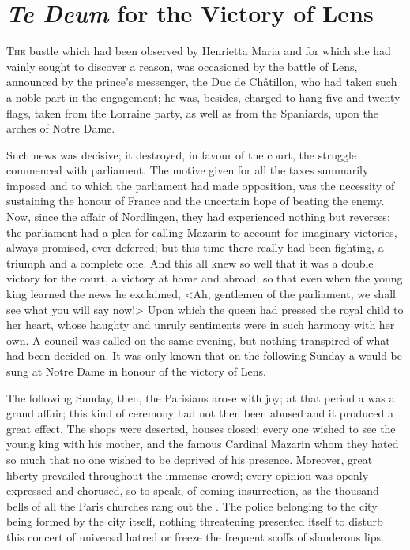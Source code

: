 \chapter{\emph{Te Deum} for the Victory of Lens}

 \lettrine{T}{he} bustle which had been observed by Henrietta Maria and for which she had vainly sought to discover a reason, was occasioned by the battle of Lens, announced by the prince's messenger, the Duc de Châtillon, who had taken such a noble part in the engagement; he was, besides, charged to hang five and twenty flags, taken from the Lorraine party, as well as from the Spaniards, upon the arches of Notre Dame.

Such news was decisive; it destroyed, in favour of the court, the struggle commenced with parliament. The motive given for all the taxes summarily imposed and to which the parliament had made opposition, was the necessity of sustaining the honour of France and the uncertain hope of beating the enemy. Now, since the affair of Nordlingen, they had experienced nothing but reverses; the parliament had a plea for calling Mazarin to account for imaginary victories, always promised, ever deferred; but this time there really had been fighting, a triumph and a complete one. And this all knew so well that it was a double victory for the court, a victory at home and abroad; so that even when the young king learned the news he exclaimed, <Ah, gentlemen of the parliament, we shall see what you will say now!> Upon which the queen had pressed the royal child to her heart, whose haughty and unruly sentiments were in such harmony with her own. A council was called on the same evening, but nothing transpired of what had been decided on. It was only known that on the following Sunday a  would be sung at Notre Dame in honour of the victory of Lens.

The following Sunday, then, the Parisians arose with joy; at that period a  was a grand affair; this kind of ceremony had not then been abused and it produced a great effect. The shops were deserted, houses closed; every one wished to see the young king with his mother, and the famous Cardinal Mazarin whom they hated so much that no one wished to be deprived of his presence. Moreover, great liberty prevailed throughout the immense crowd; every opinion was openly expressed and chorused, so to speak, of coming insurrection, as the thousand bells of all the Paris churches rang out the . The police belonging to the city being formed by the city itself, nothing threatening presented itself to disturb this concert of universal hatred or freeze the frequent scoffs of slanderous lips.

